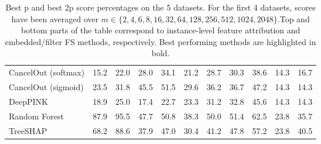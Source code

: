 \begin{table}[h!]
{{\begin{tabular}{lrrrrrrrrrr}
CancelOut (softmax) & 15.2 & 22.0 & 28.0 & 34.1 & 21.2 & 28.7 & 30.3 & 38.6 & 14.3 & 16.7 \\
CancelOut (sigmoid) & 23.5 & 31.8 & 45.5 & 51.5 & 29.6 & 36.2 & 36.7 & 47.2 & 14.3 & 14.3 \\
DeepPINK & 18.9 & 25.0 & 17.4 & 22.7 & 23.3 & 31.2 & 32.8 & 45.6 & 14.3 & 14.3 \\
Random Forest & 87.9 & 95.5 & 47.7 & 50.8 & 38.3 & 50.0 & 51.4 & 62.5 & 23.8 & 35.7 \\
TreeSHAP & 68.2 & 88.6 & 37.9 & 47.0 & 30.4 & 41.2 & 47.8 & 57.2 & 23.8 & 40.5 \\
\bottomrule
\end{tabular}}}{}
\caption{Best p and best 2p score percentages on the 5 datasets. For the first 4 datasets, scores have been averaged over $m \in \{2, 4, 6, 8, 16, 32, 64, 128, 256, 512, 1024, 2048\}$.Top and bottom parts of the table correspond to instance-level feature attribution and embedded/filter FS methods, respectively. Best performing methods are highlighted in bold.}
\end{table}
